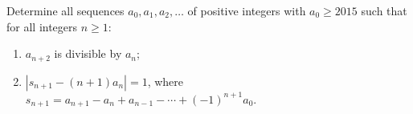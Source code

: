Determine all sequences $a_0 , a_1 , a_2 , \ldots$ of positive integers with $a_0 \ge 2015$ such that for all integers $n\ge 1$:
\begin{enumerate}[label=(\roman*)]
	\item $a_{n+2}$ is divisible by $a_n$;
	\item $|s_{n+1} - (n + 1)a_n | = 1$, where $s_{n+1} = a_{n+1} - a_n + a_{n-1} - \cdots + (-1)^{n+1} a_0$.
\end{enumerate}
